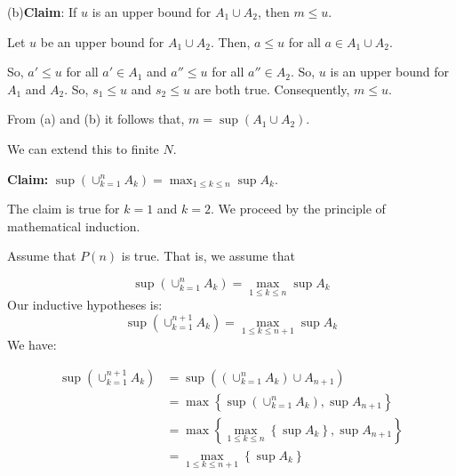 \documentclass[10pt]{article}
\begin{document}
(b)\textbf{Claim}: If $\displaystyle u$ is an upper bound for $\displaystyle A_{1} \cup A_{2}$, then $\displaystyle m\leq u$.



Let $\displaystyle u$ be an upper bound for $\displaystyle A_{1} \cup A_{2}$. Then, $\displaystyle a\leq u$ for all $\displaystyle a\in A_{1} \cup A_{2}$. 

So, $\displaystyle a'\leq u$ for all $\displaystyle a'\in A_{1}$ and $\displaystyle a''\leq u$ for all $\displaystyle a''\in A_{2}$. So, $\displaystyle u$ is an upper bound for $\displaystyle A_{1}$ and $\displaystyle A_{2}$. So, $\displaystyle s_{1} \leq u$ and $\displaystyle s_{2} \leq u$ are both true. Consequently, $\displaystyle m\leq u$.



From (a) and (b) it follows that, $\displaystyle m=\sup ( A_{1} \cup A_{2})$.



We can extend this to finite $\displaystyle N$. 



\textbf{Claim: }$\displaystyle \sup \left( \cup _{k=1}^{n} A_{k}\right) =\max_{1\leq k\leq n}\sup A_{k}$. 

The claim is true for $\displaystyle k=1$ and $\displaystyle k=2$. We proceed by the principle of mathematical induction. 



Assume that $\displaystyle P( n)$ is true. That is, we assume that


\begin{equation*}
\sup \left( \cup _{k=1}^{n} A_{k}\right) =\max_{1\leq k\leq n}\sup A_{k}
\end{equation*}
Our inductive hypotheses is:
\begin{equation*}
\sup \left( \cup _{k=1}^{n+1} A_{k}\right) =\max_{1\leq k\leq n+1}\sup A_{k}
\end{equation*}
We have:


\begin{equation*}
\begin{aligned}
\sup \left( \cup _{k=1}^{n+1} A_{k}\right) & =\sup \left(\left( \cup _{k=1}^{n} A_{k}\right) \cup A_{n+1}\right)\\
 & =\max\left\{\sup \left( \cup _{k=1}^{n} A_{k}\right) ,\sup A_{n+1}\right\}\\
 & =\max\left\{\max_{1\leq k\leq n}\left\{\sup A_{k}\right\} ,\sup A_{n+1}\right\}\\
 & =\max_{1\leq k\leq n+1}\left\{\sup A_{k}\right\}
\end{aligned}
\end{equation*}
\end{document}
